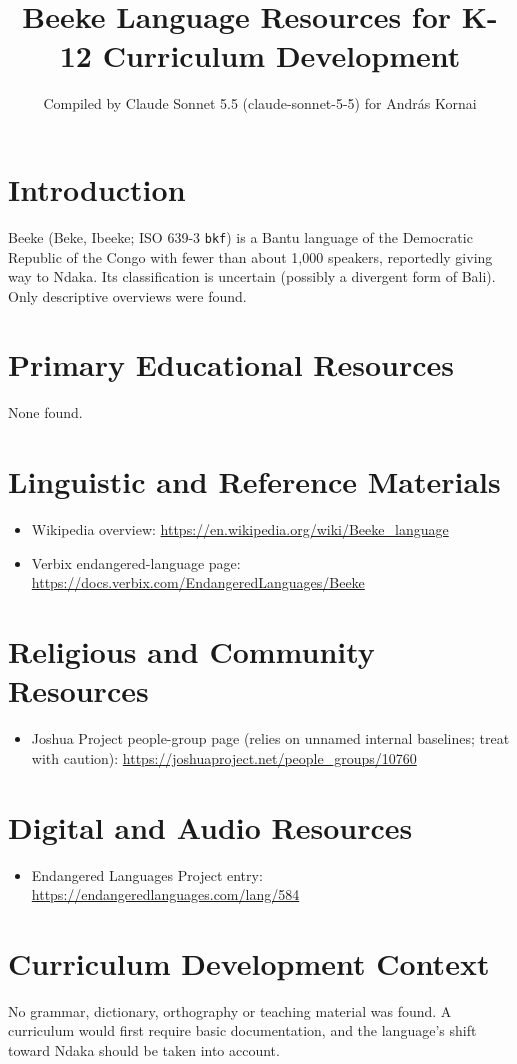 \documentclass[12pt]{article}
\title{Beeke Language Resources for K-12 Curriculum Development}
\author{Compiled by Claude Sonnet 5.5 (claude-sonnet-5-5) for Andr\'as Kornai}
\date{}
\begin{document}
\maketitle

\section{Introduction}
Beeke (Beke, Ibeeke; ISO 639-3 \texttt{bkf}) is a Bantu language of the Democratic Republic of the Congo with fewer than about 1,000 speakers, reportedly giving way to Ndaka. Its classification is uncertain (possibly a divergent form of Bali). Only descriptive overviews were found.

\section{Primary Educational Resources}
None found.

\section{Linguistic and Reference Materials}
\begin{itemize}
\item Wikipedia overview: \url{https://en.wikipedia.org/wiki/Beeke_language}
\item Verbix endangered-language page: \url{https://docs.verbix.com/EndangeredLanguages/Beeke}
\end{itemize}

\section{Religious and Community Resources}
\begin{itemize}
\item Joshua Project people-group page (relies on unnamed internal baselines; treat with caution): \url{https://joshuaproject.net/people_groups/10760}
\end{itemize}

\section{Digital and Audio Resources}
\begin{itemize}
\item Endangered Languages Project entry: \url{https://endangeredlanguages.com/lang/584}
\end{itemize}

\section{Curriculum Development Context}
No grammar, dictionary, orthography or teaching material was found. A curriculum would first require basic documentation, and the language's shift toward Ndaka should be taken into account.
\end{document}
